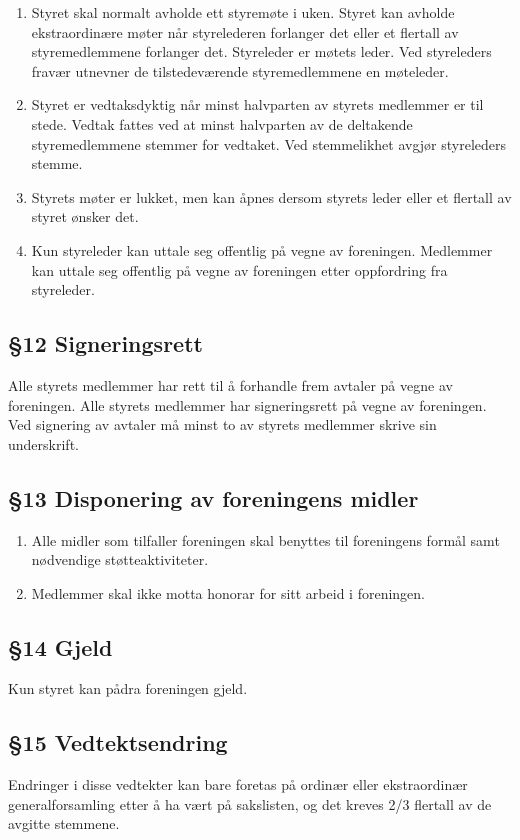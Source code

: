 \documentclass[a4paper,11pt,titlepage]{article}
\begin{document}
\begin{enumerate}
\item Styret skal normalt avholde ett styremøte i uken. Styret kan avholde ekstraordinære møter når styrelederen forlanger det eller et flertall av styremedlemmene forlanger det. Styreleder er møtets leder. Ved styreleders fravær utnevner de tilstedeværende styremedlemmene en møteleder.

\item Styret er vedtaksdyktig når minst halvparten av styrets medlemmer er til stede. Vedtak fattes ved at minst halvparten av de deltakende styremedlemmene stemmer for vedtaket. Ved stemmelikhet avgjør styreleders stemme. 

\item Styrets møter er lukket, men kan åpnes dersom styrets leder eller et flertall av styret ønsker det.

\item Kun styreleder kan uttale seg offentlig på vegne av foreningen. Medlemmer kan uttale seg offentlig på vegne av foreningen etter oppfordring fra styreleder.

\end{enumerate}


\subsection*{§12 Signeringsrett}
Alle styrets medlemmer har rett til å forhandle frem avtaler på vegne av foreningen. Alle styrets medlemmer har signeringsrett på vegne av foreningen. Ved signering av avtaler må minst to av styrets medlemmer skrive sin underskrift. 

\subsection*{§13 Disponering av foreningens midler}
\begin{enumerate}
\item Alle midler som tilfaller foreningen skal benyttes til foreningens formål samt nødvendige støtteaktiviteter.
\item Medlemmer skal ikke motta honorar for sitt arbeid i foreningen.
\end{enumerate}

\subsection*{§14 Gjeld}
Kun styret kan pådra foreningen gjeld.

\subsection*{§15 Vedtektsendring}
Endringer i disse vedtekter kan bare foretas på ordinær eller ekstraordinær generalforsamling etter å ha vært på sakslisten, og det kreves 2/3 flertall av de avgitte stemmene.
\end{document}
